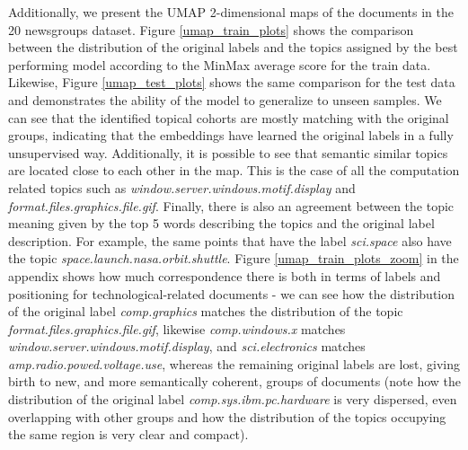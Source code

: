 \documentclass[a4paper]{article}
\begin{document}
Additionally, we present the UMAP 2-dimensional maps of the documents in the 20 newsgroups dataset. Figure \ref{umap_train_plots} shows the comparison between the distribution of the original labels and the topics assigned by the best performing model according to the MinMax average score for the train data. Likewise, Figure \ref{umap_test_plots} shows the same comparison for the test data and demonstrates the ability of the model to generalize to unseen samples. We can see that the identified topical cohorts are mostly matching with the original groups, indicating that the embeddings have learned the original labels in a fully unsupervised way. Additionally, it is possible to see that semantic similar topics are located close to each other in the map. This is the case of all the computation related topics such as \emph{window.server.windows.motif.display} and \emph{format.files.graphics.file.gif}. Finally, there is also an agreement between the topic meaning given by the top 5 words describing the topics and the original label description. For example, the same points that have the label \emph{sci.space} also have the topic \emph{space.launch.nasa.orbit.shuttle}. Figure \ref{umap_train_plots_zoom} in the appendix shows how much correspondence there is both in terms of labels and positioning for technological-related documents - we can see how the distribution of the original label \emph{comp.graphics} matches the distribution of the topic \emph{format.files.graphics.file.gif}, likewise \emph{comp.windows.x} matches \emph{window.server.windows.motif.display}, and \emph{sci.electronics} matches \emph{amp.radio.powed.voltage.use}, whereas the remaining original labels are lost, giving birth to new, and more semantically coherent, groups of documents (note how the distribution of the original label \emph{comp.sys.ibm.pc.hardware} is very dispersed, even overlapping with other groups and how the distribution of the topics occupying the same region is very clear and compact).
\end{document}
